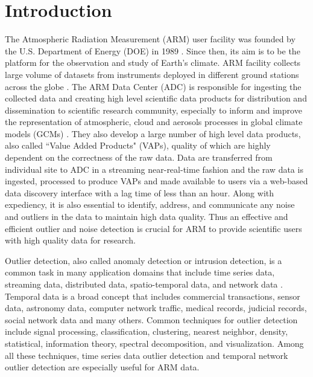 \section{Introduction}
The Atmospheric Radiation Measurement (ARM) user facility was founded by
the U.S. Department of Energy (DOE) in 1989 \cite{ARM}. Since then, its
aim is to be the platform for the observation and study of Earth's
climate. ARM facility collects large volume of datasets from instruments deployed in
different ground stations across the globe \cite{stokes1994atmospheric}.
The ARM Data Center (ADC) is responsible for ingesting the collected data and
creating high level scientific data products for distribution and
dissemination to scientific research community, especially to inform and
improve the representation of atmospheric, cloud and aerosols
processes in global climate models (GCMs)
\cite{gaustad2014scientific}. They also develop a large number of 
high level data products, also
called ``Value Added Products" (VAPs), quality of which are highly dependent on the
correctness of the raw data. Data are transferred from individual site
to ADC in a streaming near-real-time fashion and the raw data is
ingested, processed to produce VAPs and made available to users via a
web-based data discovery interface with a lag time of less than an hour.
Along with expediency, it is also essential to identify, address, and 
communicate any noise and outliers in the data to maintain high data quality.
Thus an effective and efficient outlier and noise detection
is crucial for ARM to provide scientific users with high quality data
for research.

Outlier detection, also called anomaly detection or intrusion detection,
is a common task in many application domains that include time
series data, streaming data, distributed data, spatio-temporal
data, and network data \cite{gupta2014outlier}. Temporal data is
a broad concept that includes commercial transactions, sensor
data, astronomy data, computer network traffic, medical records,
judicial records, social network data and many others. Common
techniques for outlier detection include signal processing,
classification, clustering, nearest neighbor, density,
statistical, information theory, spectral decomposition, and
visualization. Among all these techniques, time series data
outlier detection and temporal network outlier detection are
especially useful for ARM data.

